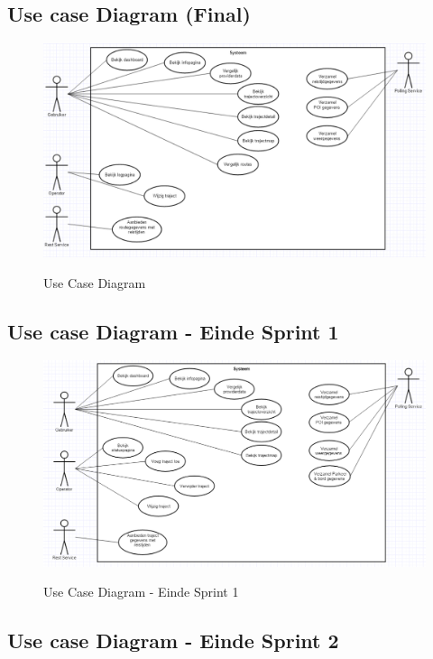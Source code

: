 \documentclass[a4paper]{article}
\begin{document}
\subsection{Use case Diagram (Final)}

\begin{figure}[H]
\centering
\includegraphics[width=\textwidth]{images/ucdiagramsprint2.png}\\
\caption{Use Case Diagram}
\end{figure}

\subsection{Use case Diagram - Einde Sprint 1}

\begin{figure}[H]
\centering
\includegraphics[width=\textwidth]{images/ucdiagramsprint1.png}\\
\caption{Use Case Diagram - Einde Sprint 1}
\end{figure}

\subsection{Use case Diagram - Einde Sprint 2}
\end{document}

